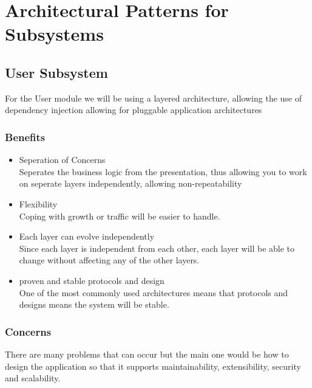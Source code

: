 \documentclass{article}
\begin{document}
 			 \section{Architectural Patterns for Subsystems}
				\subsection{User Subsystem}
				For the User module we will be using a layered architecture, allowing the use of dependency injection allowing for pluggable application architectures
					\subsubsection{Benefits}
 						\begin{itemize}
 							\item Seperation of Concerns
 							\bigskip
 							\\
 							Seperates the business logic from the presentation, thus allowing you to work on seperate layers independently, allowing non-repeatability
 							\item Flexibility
 							\bigskip
 							\\
 							Coping with growth or traffic will be easier to handle.
 							\item Each layer can evolve independently
 							\bigskip
 							\\
 							Since each layer is independent from each other, each layer will be able to change without affecting any of the other layers.
 							\item proven and stable protocols and design
 							\bigskip
 							\\
 							 One of the most commonly used architectures means that protocols and designs means the system will be stable.
 						\end{itemize} 
	\subsubsection{Concerns}
 			
 				There are many problems that can occur but the main one would be how to design the application so that it supports maintainability, extensibility, security and scalability.
\end{document}
